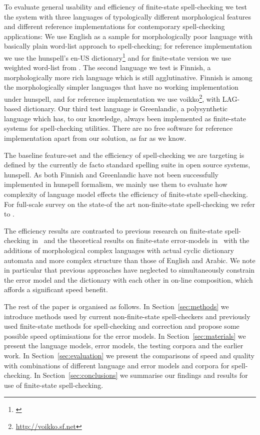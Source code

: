 \documentclass[11pt]{article}
\begin{document}
To evaluate general usability and efficiency of finite-state spell-checking we
test the system with three languages of typologically different morphological
features and different reference implementations for contemporary
spell-checking applications: We use English as a sample for morphologically
poor language with basically plain word-list approach to spell-checking; for
reference implementation we use the hunspell's en-US
dictionary\footnote{\url{}} and for finite-state version we use weighted
word-list from \cite{norvig/2010}. The second language we test is Finnish, a
morphologically more rich language which is still agglutinative. Finnish is
among the morphologically simpler languages that have no working implementation
under hunspell, and for reference implementation we use
voikko\footnote{\url{http://voikko.sf.net}}, with LAG-based dictionary. Our
third test language is Greenlandic, a polysynthetic language which has, to our
knowledge, always been implemented as finite-state systems for spell-checking
utilities. There are no free software for reference implementation apart from
our solution, as far as we know.

The baseline feature-set and the efficiency of spell-checking we are targeting
is defined by the currently de facto standard spelling suite in open source
systems, hunspell. As both Finnish and Greenlandic have not been successfully
implemented in hunspell formalism, we mainly use them to evaluate how complexity
of language model effects the efficiency of finite-state spell-checking. For
full-scale survey on the state-of the art non-finite-state spell-checking we
refer to \cite{mitton/1996}.

The efficiency results are contrasted to previous research on finite-state
spell-checking in~\cite{hassan/2008} and the theoretical results on
finite-state error-models in~\cite{mitankin/2005} with the additions of
morphological complex languages with actual cyclic dictionary automata and more
complex structure than those of English and Arabic. We note in particular that
previous approaches have neglected to simultaneously constrain the error
model and the dictionary with each other in on-line composition, which
affords a significant speed benefit.

The rest of the paper is organised as follows. In Section~\ref{sec:methods} we
introduce methods used by current non-finite-state spell-checkers and
previously used finite-state methods for spell-checking and correction and
propose some possible speed optimisations for the error models. In
Section~\ref{sec:materials} we present the language models, error models, the
testing corpora and the earlier work. In Section~\ref{sec:evaluation} we
present the comparisons of speed and quality with combinations of different
language and error models and corpora for spell-checking. In
Section~\ref{sec:conclusions} we summarise our findings and results for use
of finite-state spell-checking.
\end{document}
